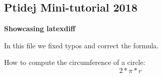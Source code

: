 \documentclass[12pt]{article}
\begin{document}
\begin{flushleft}

\section{Ptidej Mini-tutorial 2018 }

\bf{Showcasing latexdiff}

In this file we fixed typos and correct the formula. \newline

How to compute the circumference of a circle:
\begin{equation}
2*\pi*r
\end{equation}



\end{flushleft}
\end{document}
